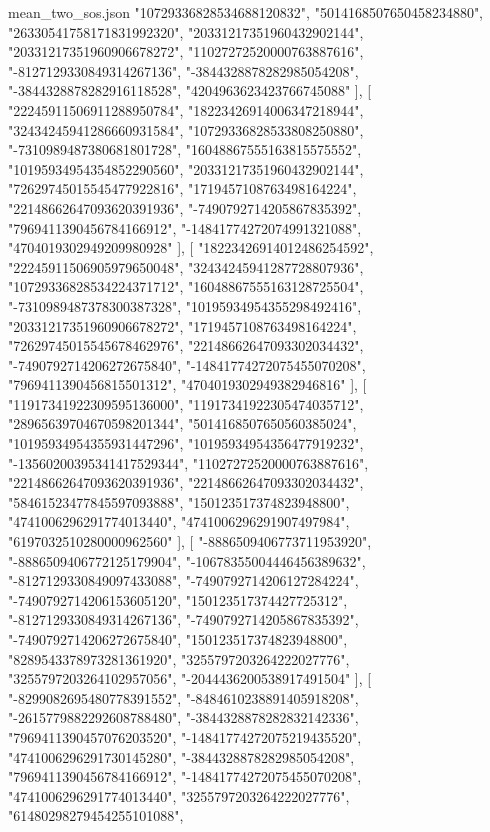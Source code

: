 \begin{filecontents*}[overwrite]{mean_two_sos.json}
    "10729336828534688120832",
    "5014168507650458234880",
    "26330541758171831992320",
    "20331217351960432902144",
    "20331217351960906678272",
    "11027272520000763887616",
    "-8127129330849314267136",
    "-3844328878282985054208",
    "-3844328878282916118528",
    "4204963623423766745088"
   ],
   [
    "22245911506911288950784",
    "18223426914006347218944",
    "32434245941286660931584",
    "10729336828533808250880",
    "-7310989487380681801728",
    "16048867555163815575552",
    "10195934954354852290560",
    "20331217351960432902144",
    "72629745015545477922816",
    "1719457108763498164224",
    "22148662647093620391936",
    "-7490792714205867835392",
    "7969411390456784166912",
    "-14841774272074991321088",
    "4704019302949209980928"
   ],
   [
    "18223426914012486254592",
    "22245911506905979650048",
    "32434245941287728807936",
    "10729336828534224371712",
    "16048867555163128725504",
    "-7310989487378300387328",
    "10195934954355298492416",
    "20331217351960906678272",
    "1719457108763498164224",
    "72629745015545678462976",
    "22148662647093302034432",
    "-7490792714206272675840",
    "-14841774272075455070208",
    "7969411390456815501312",
    "4704019302949382946816"
   ],
   [
    "11917341922309595136000",
    "11917341922305474035712",
    "28965639704670598201344",
    "5014168507650560385024",
    "10195934954355931447296",
    "10195934954356477919232",
    "-13560200395341417529344",
    "11027272520000763887616",
    "22148662647093620391936",
    "22148662647093302034432",
    "58461523477845597093888",
    "150123517374823948800",
    "4741006296291774013440",
    "4741006296291907497984",
    "6197032510280000962560"
   ],
   [
    "-8886509406773711953920",
    "-8886509406772125179904",
    "-10678355004446456389632",
    "-8127129330849097433088",
    "-7490792714206127284224",
    "-7490792714206153605120",
    "150123517374427725312",
    "-8127129330849314267136",
    "-7490792714205867835392",
    "-7490792714206272675840",
    "150123517374823948800",
    "8289543378973281361920",
    "3255797203264222027776",
    "3255797203264102957056",
    "-2044436200538917491504"
   ],
   [
    "-8299082695480778391552",
    "-8484610238891405918208",
    "-2615779882292608788480",
    "-3844328878282832142336",
    "7969411390457076203520",
    "-14841774272075219435520",
    "4741006296291730145280",
    "-3844328878282985054208",
    "7969411390456784166912",
    "-14841774272075455070208",
    "4741006296291774013440",
    "3255797203264222027776",
    "61480298279454255101088",

\end{filecontents*}
